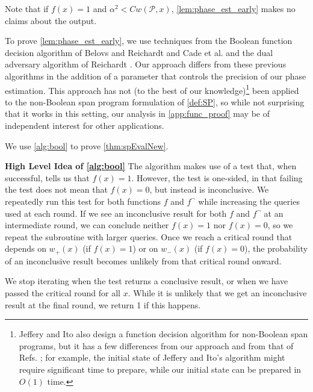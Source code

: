 \documentclass[cleveref, autoref, thm-restate,11pt]{article}
\theoremstyle{definition}
\newcommand{\sop}[1]{{\mathcal #1}}
\newcommand{\w}[2]{{w({#1},{#2})}} %
\newcommand{\wpo}[1]{{w_+({#1})}}
\newcommand{\wmo}[1]{{w_-({#1})}}
\begin{document}
\noindent Note that if $f(x)=1$ and $\alpha^2 < C\w{\sop P}{x}$, \cref{lem:phase_est_early} makes no claims about
the output. 

To prove \cref{lem:phase_est_early}, we use techniques from the
Boolean function decision algorithm of Belovs and Reichardt \cite[Section
5.2]{belovsSpanProgramsQuantum2012} and Cade et al. \cite[Section
C.2]{cadeTimeSpaceEfficient2018} and the dual adversary algorithm of Reichardt
\cite[Algorithm 1]{reichardtReflectionsQuantumQuery2011}. Our approach differs
from these previous algorithms in the addition of a parameter that controls
the precision of our phase estimation.
This approach has
not (to the best of our knowledge)\footnote{Jeffery and Ito
\cite{itoApproximateSpanPrograms2019}  also design a function decision
algorithm for non-Boolean span programs, but it has a few differences from our
approach and from that of Refs.
\cite{belovsSpanProgramsQuantum2012,cadeTimeSpaceEfficient2018}; for example,
the initial state of Jeffery and Ito's algorithm might require significant
time to prepare,  while our initial state can be prepared in $O(1)$ time.}
been applied to the non-Boolean span program formulation of \cref{def:SP}, so while
not surprising that it works in this setting, our analysis in \cref{app:func_proof} may be
of independent interest for other applications.

We use \cref{alg:bool} to prove \cref{thm:spEvalNew}.

\vspace{.3cm}
\textbf{High Level Idea of \cref{alg:bool}} The algorithm makes use of a test that, when successful, tells us that $f(x)=1$. 
However, the test is one-sided, in that failing the test does not
mean that $f(x)=0$, but instead is inconclusive. We repeatedly run this
test for both functions $f$ and $f^{\neg }$ while increasing the queries used
at each round. If we see an inconclusive result for both $f$ and $f^{\neg }$ at an
intermediate round, we can conclude neither $f(x)=1$ nor $f(x)=0$, so we
repeat the subroutine with larger queries. Once we reach a critical round that depends on $\wpo{x}$ (if $f(x)=1$) or on $\wmo{x}$ (if $f(x)=0$), the probability of an inconclusive
result becomes unlikely from that critical round onward. 

We stop iterating when the test returns a conclusive result, or when  we have passed the critical round for all $x$. While it is
unlikely that we get an inconclusive result at the final round, we return 1 if
this happens. 
\end{document}
